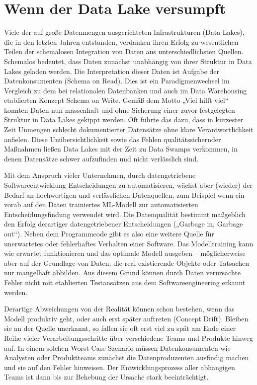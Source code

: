 \section{Wenn der Data Lake versumpft}

Viele der auf große Datenmengen ausgerichteten Infrastrukturen (Data Lakes), die in den letzten Jahren entstanden, verdanken ihren Erfolg zu wesentlichen Teilen der schemalosen Integration von Daten aus unterschiedlichsten Quellen. Schemalos bedeutet, dass Daten zunächst unabhängig von ihrer Struktur in Data Lakes geladen werden. Die Interpretation dieser Daten ist Aufgabe der Datenkonsumenten (Schema on Read). Dies ist ein Paradigmenwechsel im Vergleich zu dem bei relationalen Datenbanken und auch im Data Warehousing etablierten Konzept Schema on Write. Gemäß dem Motto „Viel hilft viel“ konnten Daten nun massenhaft und ohne Sicherung einer zuvor festgelegten Struktur in Data Lakes gekippt werden. Oft führte das dazu, dass in kürzester Zeit Unmengen schlecht dokumentierter Datensätze ohne klare Verantwortlichkeit anfielen. Diese Unübersichtlichkeit sowie das Fehlen qualitätssichernder Maßnahmen ließen Data Lakes mit der Zeit zu Data Swamps verkommen, in denen Datensätze schwer aufzufinden und nicht verlässlich sind.
	
Mit dem Anspruch vieler Unternehmen, durch datengetriebene Softwareentwicklung Entscheidungen zu automatisieren, wächst aber (wieder) der Bedarf an hochwertigen und verlässlichen Datenquellen, zum Beispiel wenn ein vorab auf den Daten trainiertes ML-Modell zur automatisierten Entscheidungsfindung verwendet wird. Die Datenqualität bestimmt maßgeblich den Erfolg derartiger datengetriebener Entscheidungen („Garbage in, Garbage out“). Neben dem Programmcode gibt es also eine weitere Quelle für unerwartetes oder fehlerhaftes Verhalten einer Software. Das Modelltraining kann wie erwartet funktionieren und das optimale Modell ausgeben – möglicherweise aber auf der Grundlage von Daten, die real existierende Objekte oder Tatsachen nur mangelhaft abbilden. Aus diesem Grund können durch Daten verursachte Fehler nicht mit etablierten Testansätzen aus dem Softwareengineering erkannt werden.
	
Derartige Abweichungen von der Realität können schon bestehen, wenn das Modell produktiv geht, oder auch erst später auftreten (Concept Drift). Bleiben sie an der Quelle unerkannt, so fallen sie oft erst viel zu spät am Ende einer Reihe vieler Verarbeitungsschritte über verschiedene Teams und Produkte hinweg auf. In einem solchen Worst-Case-Szenario müssen Datenkonsumenten wie Analysten oder Produktteams zunächst die Datenproduzenten ausfindig machen und sie auf den Fehler hinweisen. Der Entwicklungsprozess aller abhängigen Teams ist dann bis zur Behebung der Ursache stark beeinträchtigt.
	
